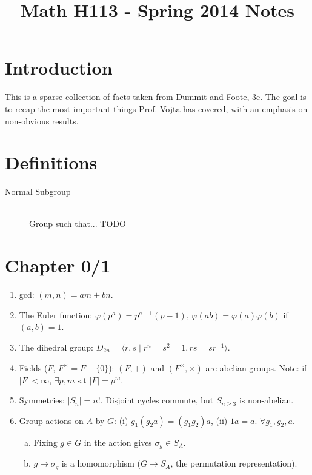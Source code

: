 \documentclass{article}
\title{Math H113 - Spring 2014 Notes}
\begin{document}
\maketitle

\section*{Introduction}

This is a sparse collection of facts taken from Dummit and Foote, 3e. The
goal is to recap the most important things Prof. Vojta has covered, with an
emphasis on non-obvious results.

\section*{Definitions}
\begin{description}
  \item[Normal Subgroup] \hfill \\
  Group such that... TODO
\end{description}


\section*{Chapter 0/1}

\begin{enumerate}[1.]
    \item gcd: $(m, n) = am + bn$.
    \item The Euler function: $\varphi(p^a) = p^{a-1}(p - 1)$, $\varphi(ab)
        = \varphi(a)\varphi(b)$ if $(a, b) = 1$.
    \item The dihedral group: $D_{2n} = \langle r, s \mid r^n = s^2 = 1, rs
        = sr^{-1} \rangle$.
    \item Fields ($F$, $F^{\times} = F - \{0\}$): $(F, +)$ and $(F^{\times},
        \times)$ are abelian groups. Note: if $|F| < \infty$, $\exists p,m$
        s.t $|F| = p^m$.
    \item Symmetries: $|S_n| = n!$. Disjoint cycles commute, but $S_{n
        \geq 3}$ is non-abelian.
    \item Group actions on $A$ by $G$: (i) $g_1(g_2a) = (g_1g_2)a$, (ii) $1a
        = a$. $\forall g_1,g_2,a$.
        \begin{enumerate}[(a)]
            \item Fixing $g \in G$ in the action gives $\sigma_g \in S_A$.
            \item $g \mapsto \sigma_g$ is a homomorphism ($G \rightarrow
                S_A$, the permutation representation).
        \end{enumerate}
\end{enumerate}
\end{document}
